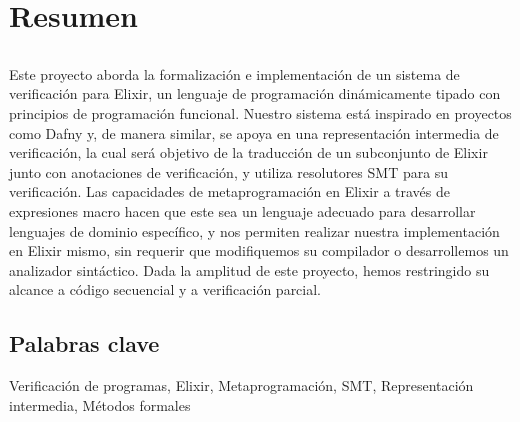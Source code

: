 \chapter*{Resumen}

\section*{\tituloPortadaVal}

Este proyecto aborda la formalización e implementación de un sistema de
verificación para Elixir, un lenguaje de programación dinámicamente tipado con
principios de programación funcional.  Nuestro sistema está inspirado en
proyectos como Dafny y, de manera similar, se apoya en una representación
intermedia de verificación, la cual será objetivo de la traducción de un 
subconjunto de Elixir junto con anotaciones de verificación, y utiliza
resolutores SMT para su verificación. Las capacidades de metaprogramación en
Elixir a través de expresiones macro hacen que este sea un lenguaje adecuado
para desarrollar lenguajes de dominio específico, y nos permiten realizar
nuestra implementación en Elixir mismo, sin requerir que modifiquemos su
compilador o desarrollemos un analizador sintáctico. Dada la amplitud de este
proyecto, hemos restringido su alcance a código secuencial y a verificación
parcial.

\section*{Palabras clave}
   
\noindent Verificación de programas, Elixir, Metaprogramación, SMT, Representación intermedia, Métodos formales
